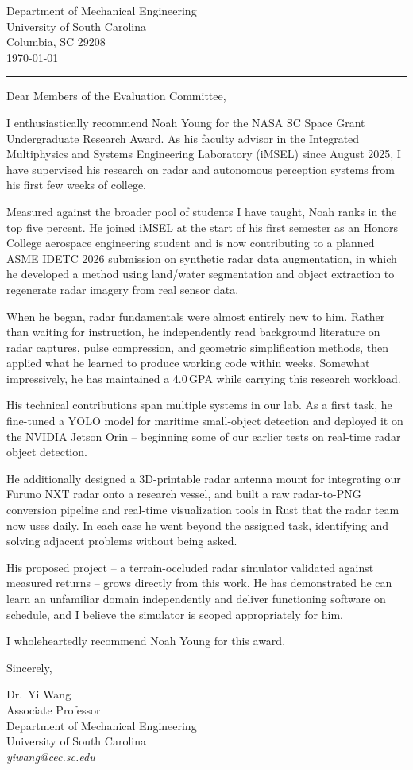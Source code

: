 \documentclass[12pt]{article}
\begin{document}
\noindent
Department of Mechanical Engineering\\
University of South Carolina\\
Columbia, SC 29208\\
\today

\noindent
{\color{garnet}\rule{\textwidth}{0.5pt}}

\vspace{0.3em}

\noindent
Dear Members of the Evaluation Committee,

I enthusiastically recommend Noah Young for the NASA SC Space Grant Undergraduate Research Award. As his faculty advisor in the Integrated Multiphysics and Systems Engineering Laboratory (iMSEL) since August 2025, I have supervised his research on radar and autonomous perception systems from his first few weeks of college.

Measured against the broader pool of students I have taught, Noah ranks in the top five percent. He joined iMSEL at the start of his first semester as an Honors College aerospace engineering student and is now contributing to a planned ASME IDETC 2026 submission on synthetic radar data augmentation, in which he developed a method using land/water segmentation and object extraction to regenerate radar imagery from real sensor data.

When he began, radar fundamentals were almost entirely new to him. Rather than waiting for instruction, he independently read background literature on radar captures, pulse compression, and geometric simplification methods, then applied what he learned to produce working code within weeks. Somewhat impressively, he has maintained a 4.0\,GPA while carrying this research workload.

His technical contributions span multiple systems in our lab. As a first task, he fine-tuned a YOLO model for maritime small-object detection and deployed it on the NVIDIA Jetson Orin -- beginning some of our earlier tests on real-time radar object detection.

He additionally designed a 3D-printable radar antenna mount for integrating our Furuno NXT radar onto a research vessel, and built a raw radar-to-PNG conversion pipeline and real-time visualization tools in Rust that the radar team now uses daily. In each case he went beyond the assigned task, identifying and solving adjacent problems without being asked.

His proposed project -- a terrain-occluded radar simulator validated against measured returns -- grows directly from this work. He has demonstrated he can learn an unfamiliar domain independently and deliver functioning software on schedule, and I believe the simulator is scoped appropriately for him.

I wholeheartedly recommend Noah Young for this award.

\vspace{0.5em}

\noindent
Sincerely,

\vspace{1em}

\noindent
Dr.\ Yi Wang\\
Associate Professor\\
Department of Mechanical Engineering\\
University of South Carolina\\
\textit{yiwang@cec.sc.edu}
\end{document}
